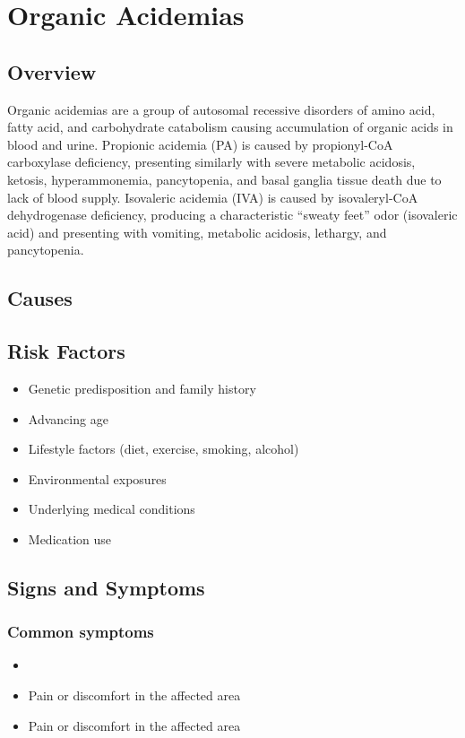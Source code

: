 \chapter{Organic Acidemias}
\label{sec:Organic Acidemias}

\section{Overview}
Organic acidemias are a group of autosomal recessive disorders of amino acid, fatty acid, and carbohydrate catabolism causing accumulation of organic acids in blood and urine. Propionic acidemia (PA) is caused by propionyl-CoA carboxylase deficiency, presenting similarly with severe metabolic acidosis, ketosis, hyperammonemia, pancytopenia, and basal ganglia tissue death due to lack of blood supply. Isovaleric acidemia (IVA) is caused by isovaleryl-CoA dehydrogenase deficiency, producing a characteristic ``sweaty feet'' odor (isovaleric acid) and presenting with vomiting, metabolic acidosis, lethargy, and pancytopenia.
\section{Causes}
\section{Risk Factors}

\begin{itemize}[noitemsep]
  \item Genetic predisposition and family history
  \item Advancing age
  \item Lifestyle factors (diet, exercise, smoking, alcohol)
  \item Environmental exposures
  \item Underlying medical conditions
  \item Medication use
\end{itemize}
\section{Signs and Symptoms}

\subsection{Common symptoms}
\begin{itemize}[noitemsep]
  \item \item Pain or discomfort in the affected area    \item Pain or discomfort in the affected area
  \end{itemize}

